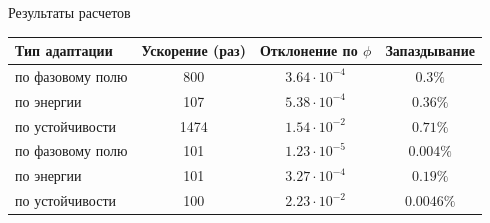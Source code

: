 \begin{frame}{Результаты расчетов}
\centering
\begin{tabular}{|l|c|c|c|}
	\hline
	Тип адаптации & Ускорение (раз) & Отклонение по $\phi$ & Запаздывание \\
	\hline \hline
	по фазовому полю	& 800	& $3.64 \cdot 10^{-4}$	& $0.3\%$		\\
	по энергии			& 107	& $5.38 \cdot 10^{-4}$	& $0.36\%$		\\
	по устойчивости		& 1474	& $1.54 \cdot 10^{-2}$	& $0.71\%$		\\
	\hline \hline
	по фазовому полю	& 101	& $1.23 \cdot 10^{-5}$	& $0.004\%$		\\
	по энергии			& 101	& $3.27 \cdot 10^{-4}$	& $0.19\%$		\\
	по устойчивости		& 100	& $2.23 \cdot 10^{-2}$	& $0.0046\%$	\\
	\hline
\end{tabular}
\end{frame}